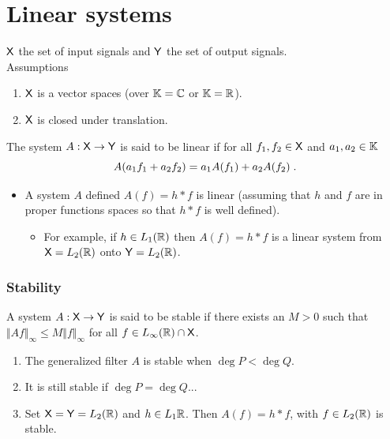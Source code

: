 \section{Linear systems}
\begin{frame}
$\mathsf{X}$ the set of \alert{input signals} and $\mathsf{Y}$ the set of \alert{output signals}.\\
\alert{Assumptions}
\begin{enumerate}
\item  $\mathsf{X}$ is a vector spaces (over $\mathbb{K}=\mathbb{C}$ or $\mathbb{K}=\mathbb{R}$).
\item  $\mathsf{X}$ is closed under translation.
\end{enumerate} 
\begin{definition}[Linearity]
The system $A: \mathsf{X} \to \mathsf{Y}$ is said to be \alert{linear} if for all $f_1,f_2 \in \mathsf{X}$ and $a_1,a_2 \in \mathbb{K}$
$$
A(a_1 f_1 + a_2 f_2)= a_1 A(f_1) + a_2 A(f_2) \;.
$$
\end{definition}
\begin{itemize}
\item \alert{A system $A$ defined $A(f) = h * f$ is linear} (assuming that $h$ and $f$ are in proper functions spaces so that $h * f$ is well defined).
\pause \begin{itemize}
\item For example, if $h \in L_1(\mathbb{R})$ then $A(f) = h * f$ is a linear system from $\mathsf{X}= L_2(\mathbb{R})$ onto $\mathsf{Y}= L_2(\mathbb{R})$.
\end{itemize}
\end{itemize}

\end{frame}

\begin{frame}
\frametitle{Stability}
\begin{definition}
A system $A: \mathsf{X} \to \mathsf{Y}$ is said to be \alert{stable} if there exists an $M>0$ such that $\Vert Af\Vert_{\infty}\leq M\Vert f\Vert_{\infty}$ for all $f\in L_\infty(\mathbb{R})\cap \mathsf{X}$.
\end{definition}
\begin{enumerate}
\item The generalized filter $A$ is stable when $\deg P<\deg Q$.
\item It is still stable if $\deg P = \deg Q$...
\item Set $\mathsf{X}=\mathsf{Y}=L_2(\mathbb{R})$ and $h \in L_1 \mathbb{R}$. Then $A(f)= h * f$, with $f \in L_2(\mathbb{R})$ is stable.
 \end{enumerate}
\end{frame}


